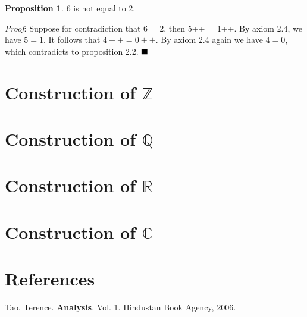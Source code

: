 \documentclass{article}
\theoremstyle{definition}
\newtheorem{proposition}{Proposition}[section]
\begin{document}
\begin{proposition}
6 is not equal to 2.
\end{proposition}

\textit{Proof}: Suppose for contradiction that 6 = 2, then 5++ = 1++. By axiom 2.4, we have $5=1$. It follows that $4++=0++$. By axiom 2.4 again we have $4=0$, which contradicts to proposition 2.2. $\hfill\blacksquare$

\section{Construction of $\mathbb{Z}$}

\section{Construction of $\mathbb{Q}$}

\section{Construction of $\mathbb{R}$}

\section{Construction of $\mathbb{C}$}

\section{References}

Tao, Terence. \textbf{Analysis}. Vol. 1. Hindustan Book Agency, 2006.
\end{document}

